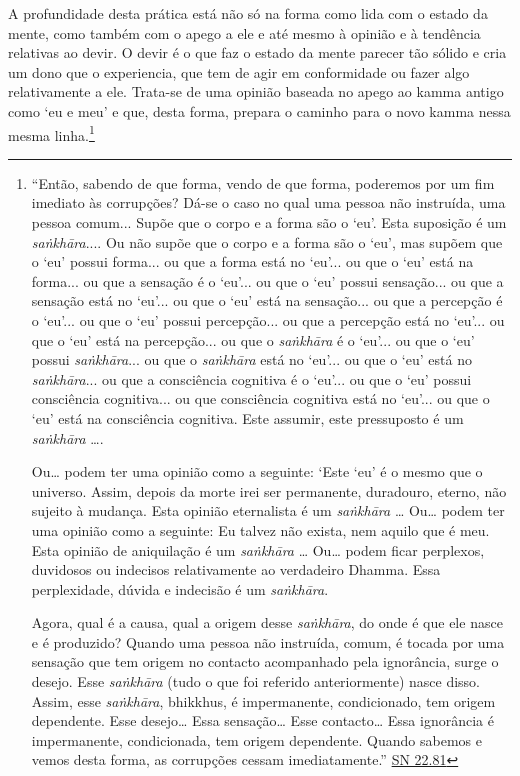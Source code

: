 A profundidade desta prática está não só na forma como lida com o estado da mente, como também com o apego a ele e até mesmo à opinião e à tendência relativas ao devir. O devir é o que faz o estado da mente parecer tão sólido e cria um dono que o experiencia, que tem de agir em conformidade ou fazer algo relativamente a ele. Trata-se de uma opinião baseada no apego ao kamma antigo como `eu e meu' e que, desta forma, prepara o caminho para o novo kamma nessa mesma linha.\footnote{``Então, sabendo de que forma, vendo de que forma, poderemos por um fim imediato às corrupções? Dá-se o caso no qual uma pessoa não instruída, uma pessoa comum... Supõe que o corpo e a forma são o `eu'. Esta suposição é um \emph{saṅkhāra}.... Ou não supõe que o corpo e a forma são o `eu', mas supõem que o `eu' possui forma... ou que a forma está no `eu'... ou que o `eu' está na forma... ou que a sensação é o `eu'... ou que o `eu' possui sensação... ou que a sensação está no `eu'... ou que o `eu' está na sensação... ou que a percepção é o `eu'... ou que o `eu' possui percepção... ou que a percepção está no `eu'... ou que o `eu' está na percepção... ou que o \emph{saṅkhāra} é o `eu'... ou que o `eu' possui \emph{saṅkhāra}... ou que o \emph{saṅkhāra} está no `eu'... ou que o `eu' está no \emph{saṅkhāra}... ou que a consciência cognitiva é o `eu'... ou que o `eu' possui consciência cognitiva... ou que consciência cognitiva está no `eu'... ou que o `eu' está na consciência cognitiva. Este assumir, este pressuposto é um \emph{saṅkhāra} \ldots.

  \hl{}

  Ou\ldots{} podem ter uma opinião como a seguinte: `Este `eu' é o mesmo que o universo. Assim, depois da morte irei ser permanente, duradouro, eterno, não sujeito à mudança.\textquotesingle{} Esta opinião eternalista é um \emph{saṅkhāra} \ldots{} Ou\ldots{} podem ter uma opinião como a seguinte: \textquotesingle Eu talvez não exista, nem aquilo que é meu\textquotesingle. Esta opinião de aniquilação é um \emph{saṅkhāra} \ldots{} Ou\ldots{} podem ficar perplexos, duvidosos ou indecisos relativamente ao verdadeiro Dhamma. Essa perplexidade, dúvida e indecisão é um \emph{saṅkhāra}.

  Agora, qual é a causa, qual a origem desse \emph{saṅkhāra}, do onde é que ele nasce e é produzido? Quando uma pessoa não instruída, comum, é tocada por uma sensação que tem origem no contacto acompanhado pela ignorância, surge o desejo. Esse \emph{saṅkhāra} (tudo o que foi referido anteriormente) nasce disso. Assim, esse \emph{saṅkhāra}, bhikkhus, é impermanente, condicionado, tem origem dependente. Esse desejo\ldots{} Essa sensação\ldots{} Esse contacto\ldots{} Essa ignorância é impermanente, condicionada, tem origem dependente. Quando sabemos e vemos desta forma, as corrupções cessam imediatamente.'' \href{https://suttacentral.net/sn22.81/en/bodhi}{SN 22.81}

}
